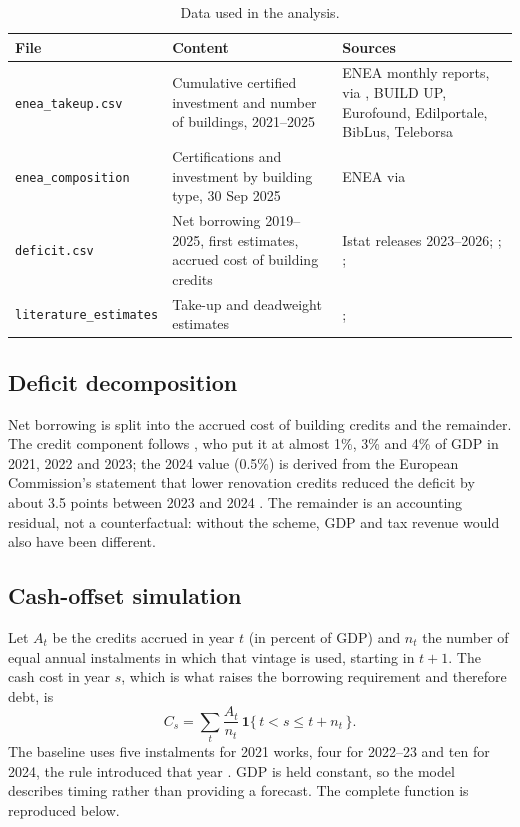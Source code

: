 \documentclass[11pt,a4paper]{article}
\begin{document}
\begin{table}[H]\centering\small
\caption{Data used in the analysis.}\label{tab:data}
\begin{tabular}{p{3.6cm}p{5.0cm}p{5.1cm}}
\toprule
File & Content & Sources \\
\midrule
\texttt{enea\_takeup.csv} & Cumulative certified investment and number of buildings, 2021--2025 & ENEA monthly reports, via \citet{upb2024}, BUILD UP, Eurofound, Edilportale, BibLus, Teleborsa \\
\texttt{enea\_composition} & Certifications and investment by building type, 30 Sep 2025 & ENEA via \citet{edilportale2025} \\
\texttt{deficit.csv} & Net borrowing 2019--2025, first estimates, accrued cost of building credits & Istat releases 2023--2026; \citet{agi2023}; \citet{corsello2025}; \citet{ec2025} \\
\texttt{literature\_estimates} & Take-up and deadweight estimates & \citet{accetturo2026}; \citet{mef_wp} \\
\bottomrule
\end{tabular}
\end{table}

\subsection{Deficit decomposition}
Net borrowing is split into the accrued cost of building credits and the remainder. The credit component follows \citet{corsello2025}, who put it at almost 1\%, 3\% and 4\% of GDP in 2021, 2022 and 2023; the 2024 value (0.5\%) is derived from the European Commission's statement that lower renovation credits reduced the deficit by about 3.5 points between 2023 and 2024 \citep{ec2025}. The remainder is an accounting residual, not a counterfactual: without the scheme, GDP and tax revenue would also have been different.

\subsection{Cash-offset simulation}
Let $A_t$ be the credits accrued in year $t$ (in percent of GDP) and $n_t$ the number of equal annual instalments in which that vintage is used, starting in $t+1$. The cash cost in year $s$, which is what raises the borrowing requirement and therefore debt, is
\begin{equation}
C_s=\sum_{t}\frac{A_t}{n_t}\,\mathbf{1}\{\,t< s\le t+n_t\,\}.
\end{equation}
The baseline uses five instalments for 2021 works, four for 2022--23 and ten for 2024, the rule introduced that year \citep{imf2024}. GDP is held constant, so the model describes timing rather than providing a forecast. The complete function is reproduced below.
\end{document}
